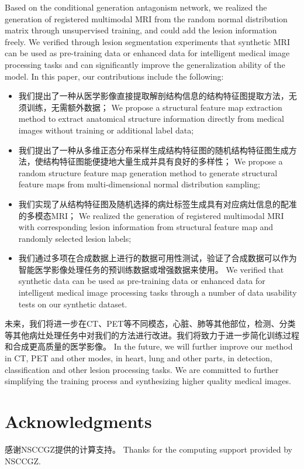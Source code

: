 \documentclass[letterpaper]{article} %
\begin{document}
Based on the conditional generation antagonism network, we realized the generation of registered multimodal MRI from the random normal distribution matrix through unsupervised training, and could add the lesion information freely. 
We verified through lesion segmentation experiments that synthetic MRI can be used as pre-training data or enhanced data for intelligent medical image processing tasks and can significantly improve the generalization ability of the model.
In this paper, our contributions include the following:
\begin{itemize}
	\item 我们提出了一种从医学影像直接提取解剖结构信息的结构特征图提取方法，无须训练，无需额外数据；
	We propose a structural feature map extraction method to extract anatomical structure information directly from medical images without training or additional label data;
	\item 我们提出了一种从多维正态分布采样生成结构特征图的随机结构特征图生成方法，使结构特征图能便捷地大量生成并具有良好的多样性；
	We propose a random structure feature map generation method to generate structural feature maps from multi-dimensional normal distribution sampling;
	\item 我们实现了从结构特征图及随机选择的病灶标签生成具有对应病灶信息的配准的多模态MRI；
	We realized the generation of registered multimodal MRI with corresponding lesion information from structural feature map and randomly selected lesion labels;
	\item 我们通过多项在合成数据上进行的数据可用性测试，验证了合成数据可以作为智能医学影像处理任务的预训练数据或增强数据来使用。
	We verified that synthetic data can be used as pre-training data or enhanced data for intelligent medical image processing tasks through a number of data usability tests on our synthetic dataset.
	
\end{itemize}

未来，我们将进一步在CT、PET等不同模态，心脏、肺等其他部位，检测、分类等其他病灶处理任务中对我们的方法进行改进。我们将致力于进一步简化训练过程和合成更高质量的医学影像。
In the future, we will further improve our method in CT, PET and other modes, in heart, lung and other parts, in detection, classification and other lesion processing tasks. We are committed to further simplifying the training process and synthesizing higher quality medical images.	

\section{ Acknowledgments}

感谢NSCCGZ提供的计算支持。
Thanks for the computing support provided by NSCCGZ.




\end{document}
